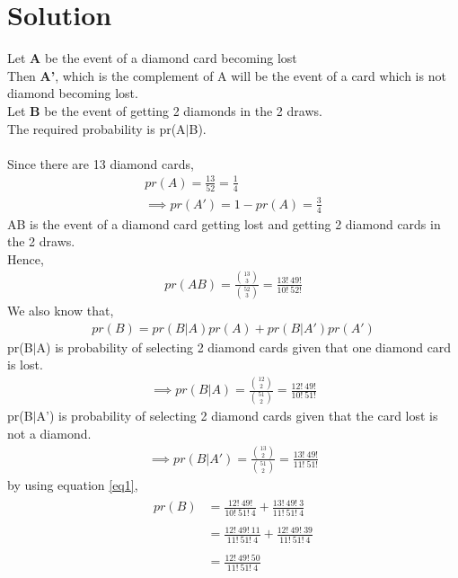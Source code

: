 \documentclass[journal,12pt,twocolumn]{IEEEtran}
\begin{document}
\section{Solution}
Let \textbf{A} be the event of a diamond card becoming lost\\
Then \textbf{A'}, which is the complement of A will be the event of a card which is not diamond becoming lost.\\
Let \textbf{B} be the event of getting 2 diamonds in the 2 draws.\\
The required probability is pr(A$|$B).\\
\\Since there are 13 diamond cards,
\begin{align}
    pr(A)=\frac{13}{52}=\frac{1}{4}\\
    \implies pr(A')=1-pr(A)=\frac{3}{4}
\end{align}
AB is the event of a diamond card getting lost and getting 2 diamond cards in the 2 draws.\\
Hence,
\begin{align}
    pr(AB)=\frac{\binom{13}{3}}{\binom{52}{3}}=\frac{13!\:49!}{10!\:52!}
\end{align}
We also know that,
\begin{align}
    pr(B)=pr(B \vert A)pr(A)+pr(B \vert A')pr(A') \label{eq1}
\end{align}
 pr(B$|$A) is probability of selecting 2 diamond cards given that one diamond card is lost.
\begin{align}
   \implies pr(B \vert A)=\frac{\binom{12}{2}}{\binom{51}{2}}=\frac{12!\:49!}{10!\:51!}
\end{align}
pr(B$|$A') is probability of selecting 2 diamond cards given that the card lost is not a diamond.
\begin{align}
    \implies pr(B \vert A')=\frac{\binom{13}{2}}{\binom{51}{2}}=\frac{13!\:49!}{11!\:51!}
\end{align}
by using equation \eqref{eq1},
\begin{align}
\begin{split}
    pr(B)&=\frac{12!\:49!}{10!\:51!\:4}+\frac{13!\:49!\:3}{11!\:51!\:4}\\\\
         &=\frac{12!\:49!\:11}{11!\:51!\:4}+\frac{12!\:49!\:39}{11!\:51!\:4}\\\\
         &=\frac{12!\:49!\:50}{11!\:51!\:4}
\end{split}
\end{align}
\end{document}
